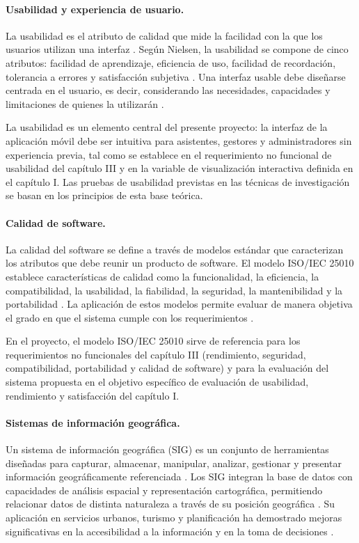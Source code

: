 \paragraph{Usabilidad y experiencia de usuario.} La usabilidad es el atributo
de calidad que mide la facilidad con la que los usuarios utilizan una
interfaz \citep{nielsen1994}. Seg\'un Nielsen, la usabilidad se compone de
cinco atributos: facilidad de aprendizaje, eficiencia de uso, facilidad de
recordaci\'on, tolerancia a errores y satisfacci\'on subjetiva
\citep{nielsen1994}. Una interfaz usable debe dise\~narse centrada en el
usuario, es decir, considerando las necesidades, capacidades y limitaciones de
quienes la utilizar\'an \citep{nielsen1994}.

La usabilidad es un elemento central del presente proyecto: la interfaz de
la aplicaci\'on m\'ovil debe ser intuitiva para asistentes, gestores y
administradores sin experiencia previa, tal como se establece en el
requerimiento no funcional de usabilidad del cap\'itulo III y en la variable
de visualizaci\'on interactiva definida en el cap\'itulo I. Las pruebas de
usabilidad previstas en las t\'ecnicas de investigaci\'on se basan en los
principios de esta base te\'orica.

\paragraph{Calidad de software.} La calidad del software se define a trav\'es
de modelos est\'andar que caracterizan los atributos que debe reunir un
producto de software. El modelo ISO/IEC 25010 establece caracter\'isticas de
calidad como la funcionalidad, la eficiencia, la compatibilidad, la
usabilidad, la fiabilidad, la seguridad, la mantenibilidad y la portabilidad
\citep{iso25010}. La aplicaci\'on de estos modelos permite evaluar de manera
objetiva el grado en que el sistema cumple con los requerimientos
\citep{iso25010}.

En el proyecto, el modelo ISO/IEC 25010 sirve de referencia para los
requerimientos no funcionales del cap\'itulo III (rendimiento, seguridad,
compatibilidad, portabilidad y calidad de software) y para la evaluaci\'on del
sistema propuesta en el objetivo espec\'ifico de evaluaci\'on de usabilidad,
rendimiento y satisfacci\'on del cap\'itulo I.

\paragraph{Sistemas de informaci\'on geogr\'afica.} Un sistema de informaci\'on
geogr\'afica (SIG) es un conjunto de herramientas dise\~nadas para capturar,
almacenar, manipular, analizar, gestionar y presentar informaci\'on
geogr\'aficamente referenciada \citep{longley2015}. Los SIG integran la base de
datos con capacidades de an\'alisis espacial y representaci\'on cartogr\'afica,
permitiendo relacionar datos de distinta naturaleza a trav\'es de su posici\'on
geogr\'afica \citep{longley2015}. Su aplicaci\'on en servicios urbanos,
turismo y planificaci\'on ha demostrado mejoras significativas en la
accesibilidad a la informaci\'on y en la toma de decisiones \citep{longley2015}.

